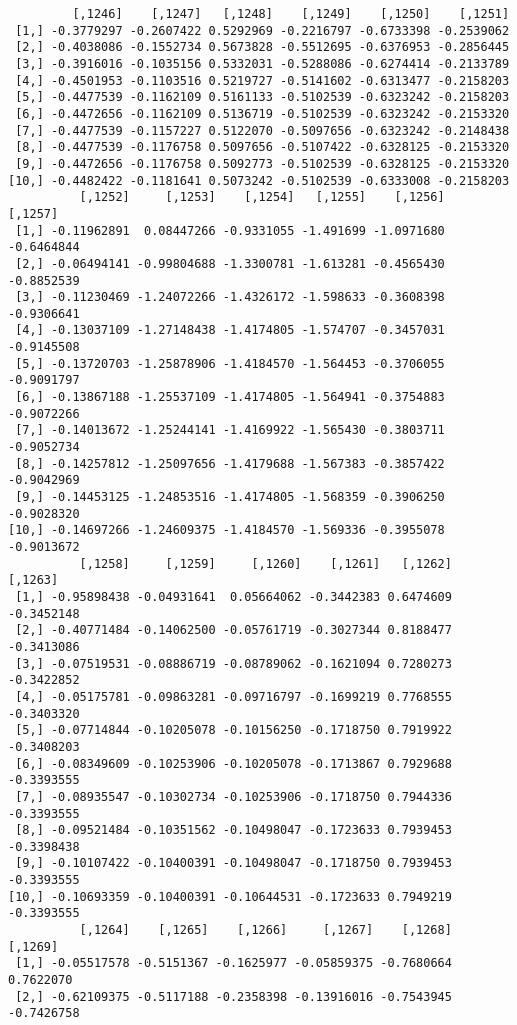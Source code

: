 \documentclass[
  letterpaper,
  DIV=11,
  numbers=noendperiod]{scrreprt}
\begin{document}
\begin{verbatim}
         [,1246]    [,1247]   [,1248]    [,1249]    [,1250]    [,1251]
 [1,] -0.3779297 -0.2607422 0.5292969 -0.2216797 -0.6733398 -0.2539062
 [2,] -0.4038086 -0.1552734 0.5673828 -0.5512695 -0.6376953 -0.2856445
 [3,] -0.3916016 -0.1035156 0.5332031 -0.5288086 -0.6274414 -0.2133789
 [4,] -0.4501953 -0.1103516 0.5219727 -0.5141602 -0.6313477 -0.2158203
 [5,] -0.4477539 -0.1162109 0.5161133 -0.5102539 -0.6323242 -0.2158203
 [6,] -0.4472656 -0.1162109 0.5136719 -0.5102539 -0.6323242 -0.2153320
 [7,] -0.4477539 -0.1157227 0.5122070 -0.5097656 -0.6323242 -0.2148438
 [8,] -0.4477539 -0.1176758 0.5097656 -0.5107422 -0.6328125 -0.2153320
 [9,] -0.4472656 -0.1176758 0.5092773 -0.5102539 -0.6328125 -0.2153320
[10,] -0.4482422 -0.1181641 0.5073242 -0.5102539 -0.6333008 -0.2158203
          [,1252]     [,1253]    [,1254]   [,1255]    [,1256]    [,1257]
 [1,] -0.11962891  0.08447266 -0.9331055 -1.491699 -1.0971680 -0.6464844
 [2,] -0.06494141 -0.99804688 -1.3300781 -1.613281 -0.4565430 -0.8852539
 [3,] -0.11230469 -1.24072266 -1.4326172 -1.598633 -0.3608398 -0.9306641
 [4,] -0.13037109 -1.27148438 -1.4174805 -1.574707 -0.3457031 -0.9145508
 [5,] -0.13720703 -1.25878906 -1.4184570 -1.564453 -0.3706055 -0.9091797
 [6,] -0.13867188 -1.25537109 -1.4174805 -1.564941 -0.3754883 -0.9072266
 [7,] -0.14013672 -1.25244141 -1.4169922 -1.565430 -0.3803711 -0.9052734
 [8,] -0.14257812 -1.25097656 -1.4179688 -1.567383 -0.3857422 -0.9042969
 [9,] -0.14453125 -1.24853516 -1.4174805 -1.568359 -0.3906250 -0.9028320
[10,] -0.14697266 -1.24609375 -1.4184570 -1.569336 -0.3955078 -0.9013672
          [,1258]     [,1259]     [,1260]    [,1261]   [,1262]    [,1263]
 [1,] -0.95898438 -0.04931641  0.05664062 -0.3442383 0.6474609 -0.3452148
 [2,] -0.40771484 -0.14062500 -0.05761719 -0.3027344 0.8188477 -0.3413086
 [3,] -0.07519531 -0.08886719 -0.08789062 -0.1621094 0.7280273 -0.3422852
 [4,] -0.05175781 -0.09863281 -0.09716797 -0.1699219 0.7768555 -0.3403320
 [5,] -0.07714844 -0.10205078 -0.10156250 -0.1718750 0.7919922 -0.3408203
 [6,] -0.08349609 -0.10253906 -0.10205078 -0.1713867 0.7929688 -0.3393555
 [7,] -0.08935547 -0.10302734 -0.10253906 -0.1718750 0.7944336 -0.3393555
 [8,] -0.09521484 -0.10351562 -0.10498047 -0.1723633 0.7939453 -0.3398438
 [9,] -0.10107422 -0.10400391 -0.10498047 -0.1718750 0.7939453 -0.3393555
[10,] -0.10693359 -0.10400391 -0.10644531 -0.1723633 0.7949219 -0.3393555
          [,1264]    [,1265]    [,1266]     [,1267]    [,1268]    [,1269]
 [1,] -0.05517578 -0.5151367 -0.1625977 -0.05859375 -0.7680664  0.7622070
 [2,] -0.62109375 -0.5117188 -0.2358398 -0.13916016 -0.7543945 -0.7426758

\end{verbatim}
\end{document}
